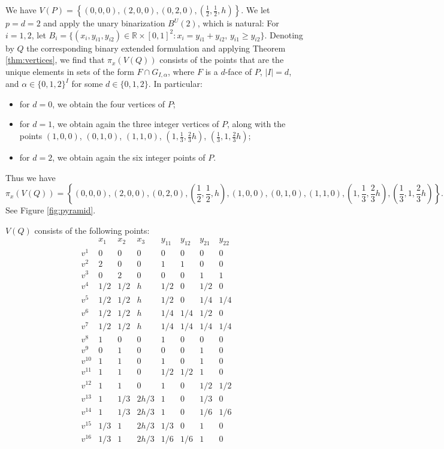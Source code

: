 \documentclass[11pt,a4paper]{article}
\newcommand{\R}{\mathbb{R}}
\newcommand{\1}{\textbf{1}}
\begin{document}
We have $V(P)=\left\{(0,0,0), (2,0,0),(0,2,0),(\frac{1}{2},\frac{1}{2},h)\right\}$.
We let $p=d=2$  and apply the unary binarization $B^U(2)$, which is natural: For $i=1,2$, let $B_i=\{(x_i,y_{i1},y_{i2})\in \R\times [0,1]^2: x_i=y_{i1}+y_{i2},\,  y_{i1}\geq y_{i2}\}$. Denoting by $Q$ the corresponding binary extended formulation and applying Theorem \ref{thm:vertices}, we find that $\pi_x(V(Q))$ consists of the points that are the unique elements in sets of the form $F\cap G_{I,\alpha}$, where $F$ is a $d$-face of $P$, $|I|=d$, and $\alpha\in\{0,1,2\}^I$ for some $d\in\{0,1,2\}$. In particular:
\begin{itemize}
\item  for $d=0$, we obtain the four vertices of $P$;
\item for $d=1$, we obtain again the three integer vertices of $P$, along with the points $(1,0,0)$, $(0,1,0)$, $(1,1,0)$, $(1,\frac13,\frac23h)$, $(\frac13,1,\frac23h)$; 
\item for $d=2$, we obtain again the six integer points of $P$.
\end{itemize}
Thus we have
\[
\pi_x(V(Q))=\left\{(0,0,0), (2,0,0),(0,2,0), \left(\frac{1}{2},\frac{1}{2},h\right), (1,0,0),(0,1,0), (1,1,0), \left(1,\frac{1}{3},\frac{2}{3}h\right), \left(\frac{1}{3},1,\frac{2}{3}h\right)\right\}.
\]
See Figure \ref{fig:pyramid}.



$V(Q)$ consists of the following points:
\[\begin{array}{c|ccccccc}
&x_1&x_2&x_3&y_{11}&y_{12}&y_{21}&y_{22}\\
\hline
v^1& 0 &  0 &   0 &  0 &  0 &  0 &  0 \\
v^2& 2 &  0 &   0 &  1 &  1 &  0 &  0 \\
v^3& 0 &  2 &   0 &  0 &  0 &  1 &  1 \\
v^4& 1/2 &1/2 & h &1/2 &  0 &1/2 &  0 \\
v^5& 1/2 &1/2 & h &1/2 & 0 &1/4 &1/4 \\
v^6& 1/2 &1/2 & h &1/4 &1/4 &1/2 &  0 \\
v^7& 1/2 &1/2 & h &1/4 &1/4 &1/4 &1/4 \\
v^8& 1 &  0 &   0 &  1 &  0 &  0 &  0 \\
v^9& 0 &  1 &   0 &  0 &  0 &  1 &  0 \\
v^{10}& 1 &  1  &  0 &  1 &  0 &  1 &  0 \\
v^{11}& 1 &  1 &   0 &1/2 &1/2 &  1 &  0 \\
v^{12}& 1 &  1 &   0 &  1 &  0 &1/2& 1/2 \\
v^{13}& 1& 1/3& 2h/3 &  1 &  0& 1/3 &  0 \\
v^{14}& 1& 1/3& 2h/3  & 1  & 0 &1/6& 1/6 \\
v^{15}& 1/3 &  1& 2h/3& 1/3 &  0 &  1 &  0 \\
v^{16}& 1/3 &  1& 2h/3& 1/6& 1/6 &  1 &  0
\end{array}\]
\end{document}
